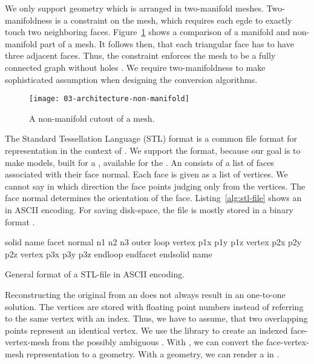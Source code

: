 \documentclass[../../ClassicThesis.tex]{subfiles}
\begin{document}
We only support geometry which is arranged in two-manifold meshes.
Two-manifoldness is a constraint on the mesh, which requires each egde
to exactly touch two neighboring faces. Figure~\ref{fig:non-manifold}
shows a comparison of a manifold and non-manifold part of a mesh. It
follows then, that each triangular face has to have three adjacent
faces. Thus, the constraint enforces the mesh to be a fully connected
graph without holes \cite[p.~28]{master-thesis}. We require
two-manifoldness to make
sophisticated assumption when designing the conversion algorithms.


\begin{figure}[h]
  \centering
  \texttt{[image: 03-architecture-non-manifold]}
  \caption{A non-manifold cutout of a mesh.}
  \label{fig:non-manifold}
\end{figure}

The Standard Tessellation Language (STL) format is a common file
format for {\threedmodel} representation in the context of
{\threedprinting}. We support the {\stlfile} format, because our goal
is to make models, built for a {\threedprinter}, available for the
{\lasercutter}. An {\stlfile} consists of a list of faces associated
with their face normal. Each face is given as a list of vertices. We
cannot say in which direction the face points judging only from the
vertices. The face normal determines the orientation of the face.
Listing~\ref{alg:stl-file} shows an {\stlfile} in ASCII encoding. For
saving disk-space, the file is mostly stored in a binary format
\cite[p.~8]{stl-file}.

\begin{listing}
\centering
\begin{CVerbatim}
solid name
 facet normal n1 n2 n3
  outer loop
  vertex p1x p1y p1z
  vertex p2x p2y p2z
  vertex p3x p3y p3z
  endloop
 endfacet
endsolid name
\end{CVerbatim}
\caption{General format of a STL-file in ASCII encoding.}
\label{alg:stl-file}
\end{listing}

Reconstructing the original {\threedmodel} from an {\stlfile} does not
always result in an one-to-one solution. The vertices are stored with
floating point numbers instead of referring to the same vertex with an
index. Thus, we have to assume, that two overlapping points represent
an identical vertex. We use the library {\meshlib} to create an
indexed face-vertex-mesh from the possibly ambiguous {\stlfile}. With
{\meshlib}, we can convert the face-vertex-mesh representation to a
{\threejs} geometry. With a {\threejs} geometry, we can render a
{\threedmodel} in {\convertify}.
\end{document}
